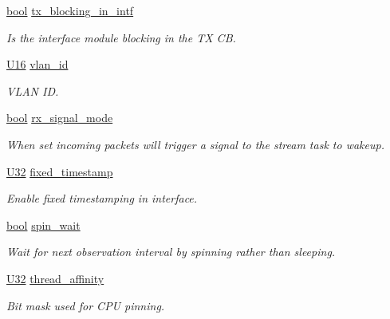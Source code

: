 \begin{DoxyCompactItemize}
\hyperlink{avb__gptp_8h_af6a258d8f3ee5206d682d799316314b1}{bool} \hyperlink{structopenavb__tl__data__cfg_aeb3581dc6183af28e4c61830959f6c86}{tx\+\_\+blocking\+\_\+in\+\_\+intf}
\begin{DoxyCompactList}\small\item\em Is the interface module blocking in the TX CB. \end{DoxyCompactList}\item 
\hyperlink{openavb__types__base__pub_8h_a0a0a322d5fa4a546d293a77ba8b4a71f}{U16} \hyperlink{structopenavb__tl__data__cfg_a1b24465e054a200402c04340ccc56eae}{vlan\+\_\+id}
\begin{DoxyCompactList}\small\item\em V\+L\+AN ID. \end{DoxyCompactList}\item 
\hyperlink{avb__gptp_8h_af6a258d8f3ee5206d682d799316314b1}{bool} \hyperlink{structopenavb__tl__data__cfg_a580a82350a4c45004177344444bd25c5}{rx\+\_\+signal\+\_\+mode}
\begin{DoxyCompactList}\small\item\em When set incoming packets will trigger a signal to the stream task to wakeup. \end{DoxyCompactList}\item 
\hyperlink{openavb__types__base__pub_8h_a696390429f2f3b644bde8d0322a24124}{U32} \hyperlink{structopenavb__tl__data__cfg_a441ba8abc0d757aaefdb2680e09f19ac}{fixed\+\_\+timestamp}
\begin{DoxyCompactList}\small\item\em Enable fixed timestamping in interface. \end{DoxyCompactList}\item 
\hyperlink{avb__gptp_8h_af6a258d8f3ee5206d682d799316314b1}{bool} \hyperlink{structopenavb__tl__data__cfg_a5e39677fff9263d5891c77729b718142}{spin\+\_\+wait}
\begin{DoxyCompactList}\small\item\em Wait for next observation interval by spinning rather than sleeping. \end{DoxyCompactList}\item 
\hyperlink{openavb__types__base__pub_8h_a696390429f2f3b644bde8d0322a24124}{U32} \hyperlink{structopenavb__tl__data__cfg_a1e5d04c7780ba1521971899952932c78}{thread\+\_\+affinity}
\begin{DoxyCompactList}\small\item\em Bit mask used for C\+PU pinning. \end{DoxyCompactList}\item 

\end{DoxyCompactItemize}
